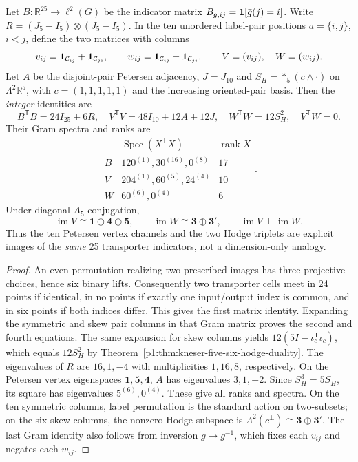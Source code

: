 \documentclass[11pt]{article}
\begin{document}
\begin{theorem}
\label{p1:thm:v341-coset-gram-hodge}
Let $B:\mathbb R^{25}\to\ell^2(G)$ be the indicator matrix
$B_{g,ij}={\bf1}[\bar g(j)=i]$.  Write $R=(J_5-I_5)\otimes(J_5-I_5)$.
In the ten unordered label-pair positions $a=\{i,j\}$, $i<j$,
define the two matrices with columns
\[
 v_{ij}={\bf1}_{\mathcal C_{ij}}+{\bf1}_{\mathcal C_{ji}},
 \qquad
 w_{ij}={\bf1}_{\mathcal C_{ij}}-{\bf1}_{\mathcal C_{ji}},
 \qquad V=(v_{ij}),\quad W=(w_{ij}).
\]
Let $A$ be the disjoint-pair Petersen adjacency,
$J=J_{10}$ and $S_H=*_5(c\wedge\cdot)$ on
$\Lambda^2\mathbb R^5$, with $c=(1,1,1,1,1)$ and the increasing
oriented-pair basis.  Then the \emph{integer} identities are
\[
 \boxed{B^{\mathsf T}B=24I_{25}+6R},\quad
 \boxed{V^{\mathsf T}V=48I_{10}+12A+12J},
 \quad\boxed{W^{\mathsf T}W=12S_H^2},\quad
 \boxed{V^{\mathsf T}W=0}.
\]
Their Gram spectra and ranks are
\[
 \begin{array}{c|c|c}
 &\operatorname{Spec}(X^{\mathsf T}X)&\operatorname{rank}X\\\hline
 B&120^{(1)},30^{(16)},0^{(8)}&17\\
 V&204^{(1)},60^{(5)},24^{(4)}&10\\
 W&60^{(6)},0^{(4)}&6
 \end{array}.
\]
Under diagonal $A_5$ conjugation,
\[
 \operatorname{im}V\cong\mathbf1\oplus\mathbf4\oplus\mathbf5,
 \qquad \operatorname{im}W\cong\mathbf3\oplus\mathbf3',
 \qquad \operatorname{im}V\perp\operatorname{im}W.
\]
Thus the ten Petersen vertex channels and the two Hodge triplets
are explicit images of the \emph{same} 25 transporter indicators,
not a dimension-only analogy.
\end{theorem}
\begin{proof}
An even permutation realizing two prescribed images has three
projective choices, hence six binary lifts.  Consequently two
transporter cells meet in 24 points if identical, in no points
if exactly one input/output index is common, and in six points
if both indices differ.  This gives the first matrix identity.
Expanding the symmetric and skew pair columns in that Gram matrix
proves the second and fourth equations.  The same expansion for
skew columns yields $12(5I-\iota_c^{\mathsf T}\iota_c)$,
which equals $12S_H^2$ by
Theorem~\ref{p1:thm:kneser-five-six-hodge-duality}.
The eigenvalues of $R$ are $16,1,-4$ with multiplicities
$1,16,8$, respectively.  On the Petersen vertex eigenspaces
$\mathbf1,\mathbf5,\mathbf4$, $A$ has eigenvalues $3,1,-2$.
Since $S_H^3=5S_H$, its square has eigenvalues $5^{(6)},0^{(4)}$.
These give all ranks and spectra.  On the ten symmetric columns,
label permutation is the standard action on two-subsets; on the six
skew columns, the nonzero Hodge subspace is
$\Lambda^2(c^\perp)\cong\mathbf3\oplus\mathbf3'$.
The last Gram identity also follows from inversion $g\mapsto g^{-1}$,
which fixes each $v_{ij}$ and negates each $w_{ij}$.
\end{proof}
\end{document}
